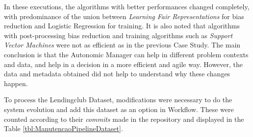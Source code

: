 \documentclass[runningheads]{llncs}
\begin{document}
\begin{table}[H]
\begin{center}
  \caption{Top options chosen by Autonomic Manager - 25\% Performance/75\% Fairness}
\label{tbl:ScoreMAPEKLendingclubOverall2575}
\end{center}
\end{table}

In these executions, the algorithms with better performances changed completely, with predominance of the union between \textit{Learning Fair Representations} for bias reduction and Logistic Regression for training. It is also noted that algorithms with post-processing bias reduction and training algorithms such as \textit{Support Vector Machines} were not as efficient as in the previous Case Study. The main conclusion is that the Autonomic Manager can help in different problem contexts and data, and help in a decision in a more efficient and agile way. However, the data and metadata obtained did not help to understand why these changes happen.

To process the Lendingclub Dataset, modifications were necessary to do the system evolution and add this dataset as an option in Workflow. These were counted according to their \textit{commits} made in the repository and displayed in the Table \ref{tbl:ManutencaoPipelineDataset}.
\end{document}
